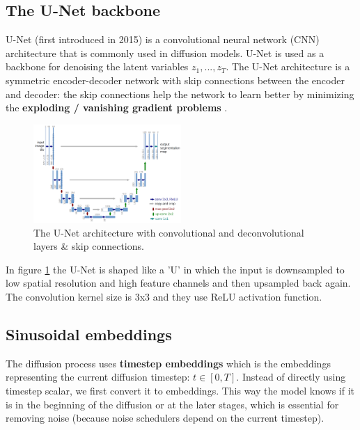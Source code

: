 \subsection{The U-Net backbone}
\label{subsec:stable_diffusion_u_net_backbone}

U-Net (first introduced in 2015) \cite{unet} is a convolutional neural network (CNN) architecture that is commonly used in diffusion models. U-Net is used as a backbone for denoising the latent variables $z_1, ..., z_T$. The U-Net architecture is a symmetric encoder-decoder network with skip connections between the encoder and decoder: the skip connections help the network to learn better by minimizing the \textbf{exploding / vanishing gradient problems} \cite{exploding_vanishing_gradients}.

\begin{figure}
    \centering
    \includegraphics[width=0.5\textwidth]{images/diffusion_models/stable_diffusion/u-net-architecture.png}
    \caption{The U-Net architecture \cite{unet} with convolutional and deconvolutional layers \& skip connections.}
    \label{fig:unet_architecture}
\end{figure}

In figure \ref{fig:unet_architecture} the U-Net is shaped like a 'U' in which the input is downsampled to low spatial resolution and high feature channels and then upsampled back again. The convolution kernel size is 3x3 and they use ReLU activation function.








\subsection{Sinusoidal embeddings}
\label{subsec:sinusoidal_embeddings}

The diffusion process uses \textbf{timestep embeddings} which is the embeddings representing the current diffusion timestep: $t \in [0, T]$. Instead of directly using timestep scalar, we first convert it to embeddings. This way the model knows if it is in the beginning of the diffusion or at the later stages, which is essential for removing noise (because noise schedulers depend on the current timestep).

